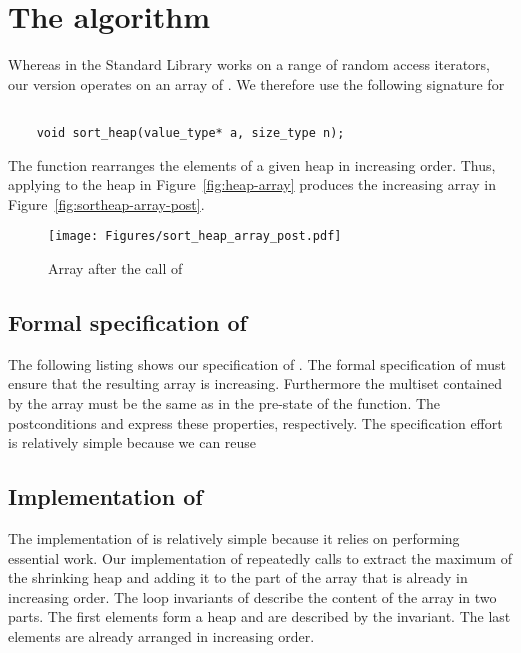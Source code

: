\section{The \sortheap algorithm}

Whereas in the \cxx Standard Library \cite[\S 28.7.7.4]{cxx-17-draft}
\sortheap works on a range of random access iterators,
our version operates on an array of .
We therefore use the following signature for \sortheap

\begin{lstlisting}[style = acsl-block]

    void sort_heap(value_type* a, size_type n);
\end{lstlisting}

The function \sortheap rearranges the elements of a given heap 
in increasing order.
Thus, applying \sortheap to the heap in Figure~\ref{fig:heap-array}
produces the increasing array in Figure~\ref{fig:sortheap-array-post}.

\begin{figure}[hbt]
\centering
\texttt{[image: Figures/sort\_heap\_array\_post.pdf]}
\caption{Array after the call of \sortheap}
\end{figure}

\FloatBarrier

\subsection{Formal specification of \sortheap}

The following listing shows our specification of \sortheap.
The formal specification of \sortheap must ensure that the
resulting array is increasing.
Furthermore the multiset contained by the array must be the same
as in the pre-state of the function.
The postconditions  and  express these properties, respectively.
The specification effort is relatively simple because we can reuse



\clearpage

\subsection{Implementation of \sortheap}

The implementation of \sortheap is relatively simple because it relies on
 performing essential work.
Our implementation of \sortheap repeatedly calls \popheap
to extract the maximum of the shrinking heap and adding it
to the part of the array that is already in increasing order.
The loop invariants of \sortheap describe the content of the array
in two parts.
The first  elements form a heap and are described by the 
invariant.
The last  elements are already arranged in increasing order.

